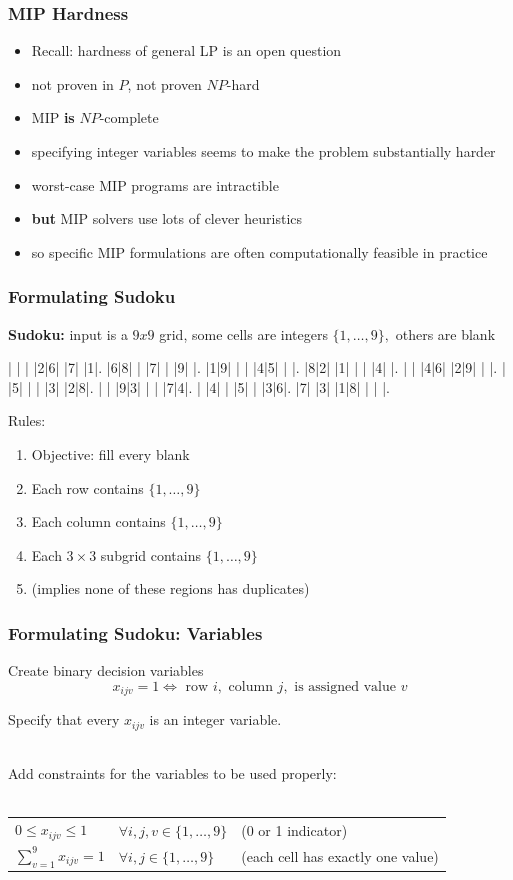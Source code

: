\documentclass{beamer}
\newcommand{\stanza}{ \\~\ }
\begin{document}
\begin{frame} \frametitle{MIP Hardness}
  \begin{itemize}
  \item Recall: hardness of general LP is an open question
  \item not proven in $P$, not proven $NP$-hard
  \item MIP \textbf{is} $NP$-complete
  \item specifying integer variables seems to make the problem substantially harder
  \item worst-case MIP programs are intractible
  \item \textbf{but} MIP solvers use lots of clever heuristics
  \item so specific MIP formulations are often computationally feasible in practice
  \end{itemize}
\end{frame}

\begin{frame} \frametitle{Formulating Sudoku}
  \textbf{Sudoku:} input is a $9 x 9$ grid, some cells are integers $\{1, \ldots, 9\},$ others are blank

  \begin{sudoku}
    | | | |2|6| |7| |1|.
    |6|8| | |7| | |9| |.
    |1|9| | | |4|5| | |.
    |8|2| |1| | | |4| |.
    | | |4|6| |2|9| | |.
    | |5| | | |3| |2|8|.
    | | |9|3| | | |7|4|.
    | |4| | |5| | |3|6|.
    |7| |3| |1|8| | | |.
  \end{sudoku}
  
  Rules:
  \begin{enumerate}
  \item Objective: fill every blank
  \item Each row contains $\{1, \ldots, 9\}$
  \item Each column contains $\{1, \ldots, 9\}$
  \item Each $3 \times 3$ subgrid contains $\{1, \ldots, 9\}$
  \item (implies none of these regions has duplicates)
  \end{enumerate}
  
  \end{frame}

\begin{frame} \frametitle{Formulating Sudoku: Variables}
  Create binary decision variables
  \[ x_{ijv} = 1 \Leftrightarrow
  \text{ row } i,
  \text{ column } j,
  \text{ is assigned value } v \]

  Specify that every $x_{ijv}$ is an integer variable.
  \stanza

  Add constraints for the variables to be used properly:
  \stanza
  
  \begin{tabular}{lll}
    $0 \leq x_{ijv} \leq 1$ & $\forall i, j, v \in \{1, \ldots, 9\}$ & (0 or 1 indicator) \\
    $\sum_{v=1}^9 x_{ijv} = 1$ & $\forall i, j \in \{1, \ldots, 9\}$ & (each cell has exactly one value)
  \end{tabular}
  
\end{frame}
\end{document}
